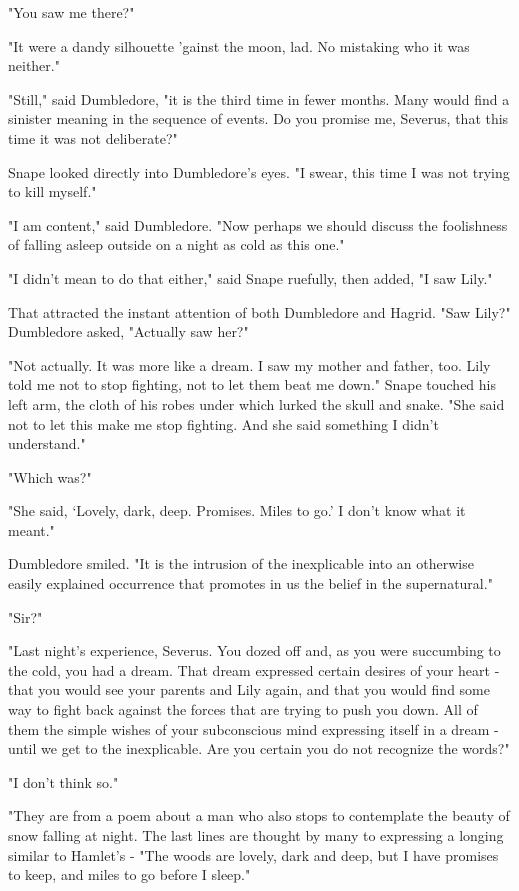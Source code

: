 "You saw me there?"

"It were a dandy silhouette 'gainst the moon, lad. No mistaking who it was neither."

"Still," said Dumbledore, "it is the third time in fewer months. Many would find a sinister meaning in the sequence of events. Do you promise me, Severus, that this time it was not deliberate?"

Snape looked directly into Dumbledore's eyes. "I swear, this time I was not trying to kill myself."

"I am content," said Dumbledore. "Now perhaps we should discuss the foolishness of falling asleep outside on a night as cold as this one."

"I didn't mean to do that either," said Snape ruefully, then added, "I saw Lily."

That attracted the instant attention of both Dumbledore and Hagrid. "Saw Lily?" Dumbledore asked, "Actually saw her?"

"Not actually. It was more like a dream. I saw my mother and father, too. Lily told me not to stop fighting, not to let them beat me down." Snape touched his left arm, the cloth of his robes under which lurked the skull and snake. "She said not to let this make me stop fighting. And she said something I didn't understand."

"Which was?"

"She said, `Lovely, dark, deep. Promises. Miles to go.' I don't know what it meant."

Dumbledore smiled. "It is the intrusion of the inexplicable into an otherwise easily explained occurrence that promotes in us the belief in the supernatural."

"Sir?"

"Last night's experience, Severus. You dozed off and, as you were succumbing to the cold, you had a dream. That dream expressed certain desires of your heart - that you would see your parents and Lily again, and that you would find some way to fight back against the forces that are trying to push you down. All of them the simple wishes of your subconscious mind expressing itself in a dream - until we get to the inexplicable. Are you certain you do not recognize the words?"

"I don't think so."

"They are from a poem about a man who also stops to contemplate the beauty of snow falling at night. The last lines are thought by many to expressing a longing similar to Hamlet's - "The woods are lovely, dark and deep, but I have promises to keep, and miles to go before I sleep."

